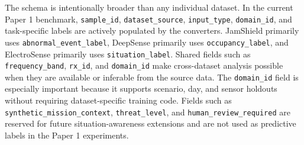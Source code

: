 \documentclass[11pt]{article}
\newcommand{\artifact}[1]{\texttt{#1}}
\begin{document}
The schema is intentionally broader than any individual dataset. In the current Paper 1 benchmark, \artifact{sample\_id}, \artifact{dataset\_source}, \artifact{input\_type}, \artifact{domain\_id}, and task-specific labels are actively populated by the converters. JamShield primarily uses \artifact{abnormal\_event\_label}, DeepSense primarily uses \artifact{occupancy\_label}, and ElectroSense primarily uses \artifact{situation\_label}. Shared fields such as \artifact{frequency\_band}, \artifact{rx\_id}, and \artifact{domain\_id} make cross-dataset analysis possible when they are available or inferable from the source data. The \artifact{domain\_id} field is especially important because it supports scenario, day, and sensor holdouts without requiring dataset-specific training code. Fields such as \artifact{synthetic\_mission\_context}, \artifact{threat\_level}, and \artifact{human\_review\_required} are reserved for future situation-awareness extensions and are not used as predictive labels in the Paper 1 experiments.
\end{document}
